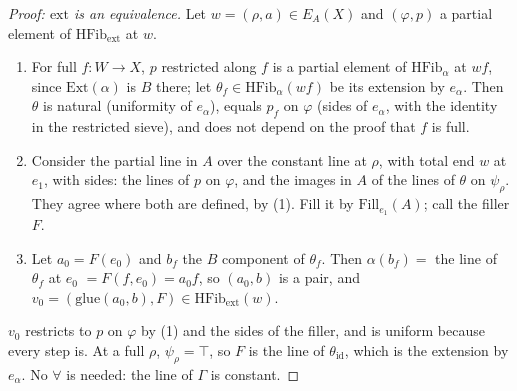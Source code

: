 \documentclass[11pt]{article}
\newcommand{\Ext}{\mathrm{Ext}}
\newcommand{\ext}{\mathrm{ext}}
\newcommand{\glue}{\mathrm{glue}}
\newcommand{\HFib}{\mathrm{HFib}}
\newcommand{\id}{\mathrm{id}}
\theoremstyle{plain}
\theoremstyle{definition}
\theoremstyle{remark}
\begin{document}
\begin{proof}[Proof: $\ext$ is an equivalence]
Let $w=(\rho,a)\in E_A(X)$ and $(\varphi,p)$ a partial element of
$\HFib_\ext$ at $w$.
\begin{enumerate}
\item For full $f:W\to X$, $p$ restricted along $f$ is a partial element
  of $\HFib_\alpha$ at $wf$, since $\Ext(\alpha)$ is $B$ there; let
  $\theta_f\in\HFib_\alpha(wf)$ be its extension by $e_\alpha$. Then
  $\theta$ is natural (uniformity of $e_\alpha$), equals $p_f$ on
  $\varphi$ (sides of $e_\alpha$, with the identity in the restricted
  sieve), and does not depend on the proof that $f$ is full.
\item Consider the partial line in $A$ over the constant line at $\rho$,
  with total end $w$ at $e_1$, with sides: the lines of $p$ on $\varphi$,
  and the images in $A$ of the lines of $\theta$ on $\psi_\rho$. They
  agree where both are defined, by (1). Fill it by
  $\mathrm{Fill}_{e_1}(A)$; call the filler $F$.
\item Let $a_0=F(e_0)$ and $b_f$ the $B$ component of $\theta_f$. Then
  $\alpha(b_f)=$ the line of $\theta_f$ at $e_0$ $=F(f,e_0)=a_0f$, so
  $(a_0,b)$ is a pair, and $v_0=(\glue(a_0,b),F)\in\HFib_\ext(w)$.
\end{enumerate}
$v_0$ restricts to $p$ on $\varphi$ by (1) and the sides of the filler,
and is uniform because every step is. At a full $\rho$, $\psi_\rho=\top$,
so $F$ is the line of $\theta_\id$, which is the extension by $e_\alpha$.
No $\forall$ is needed: the line of $\Gamma$ is constant.
\end{proof}
\end{document}
